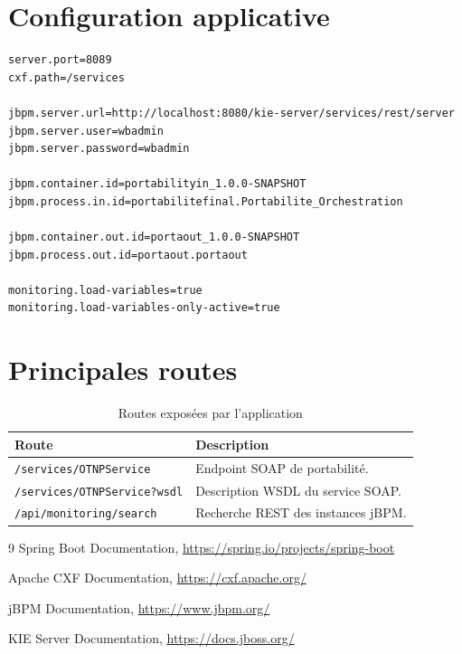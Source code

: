 \documentclass[12pt,a4paper]{report}
\begin{document}
\appendix
\chapter{Configuration applicative}
\begin{lstlisting}[caption={Extrait de configuration application.properties}]
server.port=8089
cxf.path=/services

jbpm.server.url=http://localhost:8080/kie-server/services/rest/server
jbpm.server.user=wbadmin
jbpm.server.password=wbadmin

jbpm.container.id=portabilityin_1.0.0-SNAPSHOT
jbpm.process.in.id=portabilitefinal.Portabilite_Orchestration

jbpm.container.out.id=portaout_1.0.0-SNAPSHOT
jbpm.process.out.id=portaout.portaout

monitoring.load-variables=true
monitoring.load-variables-only-active=true
\end{lstlisting}

\chapter{Principales routes}
\begin{table}[h]
    \centering
    \begin{tabular}{p{4cm}p{8cm}}
        \toprule
        \textbf{Route} & \textbf{Description} \\
        \midrule
        \texttt{/services/OTNPService} & Endpoint SOAP de portabilité. \\
        \texttt{/services/OTNPService?wsdl} & Description WSDL du service SOAP. \\
        \texttt{/api/monitoring/search} & Recherche REST des instances jBPM. \\
        \bottomrule
    \end{tabular}
    \caption{Routes exposées par l'application}
\end{table}

\begin{thebibliography}{9}
    Spring Boot Documentation, \url{https://spring.io/projects/spring-boot}

    Apache CXF Documentation, \url{https://cxf.apache.org/}

    jBPM Documentation, \url{https://www.jbpm.org/}

    KIE Server Documentation, \url{https://docs.jboss.org/}
\end{thebibliography}
\end{document}
